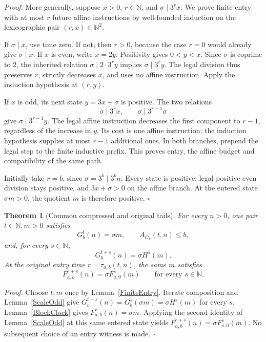 \documentclass[11pt,letterpaper]{article}
\newcommand{\N}{\mathbb{N}}
\newtheorem{theorem}{Theorem}
\newenvironment{proof}{\noindent\textit{Proof.}}{\hfill\(\square\)}
\begin{document}
\begin{proof}
More generally, suppose \(x>0\), \(r\in\N\), and \(\sigma\mid3^r x\).
We prove finite entry with at most \(r\) future affine instructions by
well-founded induction on the lexicographic pair \((r,x)\in\N^2\).

If \(\sigma\mid x\), use time zero. If not, then \(r>0\), because the
case \(r=0\) would already give \(\sigma\mid x\).
If \(x\) is even, write \(x=2y\). Positivity gives \(0<y<x\).
Since \(\sigma\) is coprime to \(2\), the inherited relation
\(\sigma\mid 2\cdot3^r y\) implies \(\sigma\mid3^r y\).
The legal division thus preserves \(r\), strictly decreases \(x\), and
uses no affine instruction. Apply the induction hypothesis at \((r,y)\).

If \(x\) is odd, its next state \(y=3x+\sigma\) is positive.
The two relations
\[
\sigma\mid3^r x,\qquad
\sigma\mid3^{r-1}\sigma
\]
give \(\sigma\mid3^{r-1}y\).
The legal affine instruction decreases the first component to \(r-1\),
regardless of the increase in \(y\). Its cost is one affine instruction;
the induction hypothesis supplies at most \(r-1\) additional ones.
In both branches, prepend the legal step to the finite inductive prefix.
This proves entry, the affine budget and compatibility of the same path.

Initially take \(r=b\), since \(\sigma=3^b\mid3^b n\).
Every state is positive: legal positive even division stays positive,
and \(3x+\sigma>0\) on the affine branch. At the entered state
\(\sigma m>0\), the quotient \(m\) is therefore positive.
\end{proof}

\begin{theorem}[Common compressed and original tails]\label{CommonTail}
For every \(n>0\), one pair \(t\in\N,m>0\) satisfies
\[
G_b^t(n)=\sigma m,\qquad A_{G_b}(t,n)\le b,
\]
and, for every \(s\in\N\),
\[
G_b^{t+s}(n)=\sigma H^s(m).
\]
At the original entry time \(r=\tau_{a,b}(t,n)\), the same \(m\) satisfies
\[
F_{a,b}^{r+s}(n)=\sigma F_{a,0}^{s}(m)
\qquad\text{for every }s\in\N.
\]
\end{theorem}

\begin{proof}
Choose \(t,m\) once by Lemma~\ref{FiniteEntry}.
Iterate composition and Lemma~\ref{ScaleOdd} give
\(G_b^{t+s}(n)=G_b^s(\sigma m)=\sigma H^s(m)\) for every \(s\).
Lemma~\ref{BlockClock} gives \(F_{a,b}^{r}(n)=\sigma m\).
Applying the second identity of Lemma~\ref{ScaleOdd} at this same entered
state yields \(F_{a,b}^{r+s}(n)=\sigma F_{a,0}^{s}(m)\).
No subsequent choice of an entry witness is made.
\end{proof}
\end{document}
